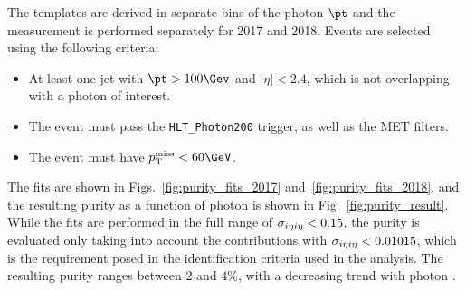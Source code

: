 The templates are derived in separate bins of the photon $\pt$ and the measurement is performed separately for 2017 and 2018. Events are selected using the following criteria:

\begin{itemize}
    \item At least one jet with $\pt>100\Gev$ and $|\eta|<2.4$, which is not overlapping with a photon of interest.
    \item The event must pass the \texttt{HLT\_Photon200} trigger, as well as the MET filters.
    \item The event must have $\ptmiss<60\GeV$.
\end{itemize}

The fits are shown in Figs.~\ref{fig:purity_fits_2017} and~\ref{fig:purity_fits_2018}, and the resulting purity as a function of photon \pt is shown in Fig.~\ref{fig:purity_result}. While the fits are performed in the full range of $\sigma_{i\eta i\eta}<0.15$, the purity is evaluated only taking into account the contributions with $\sigma_{i\eta i\eta}<0.01015$, which is the requirement posed in the identification criteria used in the analysis. The resulting purity ranges between $2$ and $4\%$, with a decreasing trend with photon \pt.


